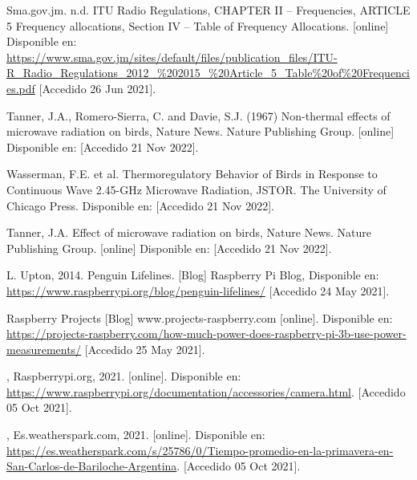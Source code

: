 \begin{flushleft}
\begin{thebibliography}{9}
Sma.gov.jm. n.d. ITU Radio Regulations, CHAPTER II – Frequencies, ARTICLE 5 Frequency allocations, Section IV – Table of Frequency Allocations. [online] Disponible en: \href{https://www.sma.gov.jm/sites/default/files/publication_files/ITU-R_Radio_Regulations_2012_\%202015_\%20Article_5_Table\%20of\%20Frequencies.pdf}{https://www.sma.gov.jm/sites/default/files/publication\_files/ITU-R\_Radio\_Regulations\_2012\_\%202015\_\%20Article\_5\_Table\%20of\%20Frequencies.pdf} [Accedido 26 Jun 2021].

Tanner, J.A., Romero-Sierra, C. and Davie, S.J. (1967) Non-thermal effects of microwave radiation on birds, Nature News. Nature Publishing Group. [online] Disponible en:  [Accedido 21 Nov 2022].

Wasserman, F.E. et al. Thermoregulatory Behavior of Birds in Response to Continuous Wave 2.45-GHz Microwave Radiation, JSTOR. The University of Chicago Press. Disponible en:  [Accedido 21 Nov 2022].

Tanner, J.A. Effect of microwave radiation on birds, Nature News. Nature Publishing Group. [online] Disponible en:  [Accedido 21 Nov 2022].

L. Upton, 2014. Penguin Lifelines. [Blog] Raspberry Pi Blog, Disponible en: \href{https://www.raspberrypi.org/blog/penguin-lifelines/}{https://www.raspberrypi.org/blog/penguin-lifelines/} [Accedido 24 May 2021].

Raspberry Projects [Blog] www.projects-raspberry.com [online]. Disponible en: \href{https://projects-raspberry.com/how-much-power-does-raspberry-pi-3b-use-power-measurements/}{https://projects-raspberry.com/how-much-power-does-raspberry-pi-3b-use-power-measurements/} [Accedido 25 May 2021].

, Raspberrypi.org, 2021. [online]. Disponible en: \href{https://www.raspberrypi.org/documentation/accessories/camera.html}{https://www.raspberrypi.org/documentation/accessories/camera.html}. [Accedido 05  Oct 2021].

, Es.weatherspark.com, 2021. [online]. Disponible en: \href{https://es.weatherspark.com/s/25786/0/Tiempo-promedio-en-la-primavera-en-San-Carlos-de-Bariloche-Argentina}{https://es.weatherspark.com/s/25786/0/Tiempo-promedio-en-la-primavera-en-San-Carlos-de-Bariloche-Argentina}. [Accedido 05 Oct 2021].


\end{thebibliography}
\end{flushleft}
